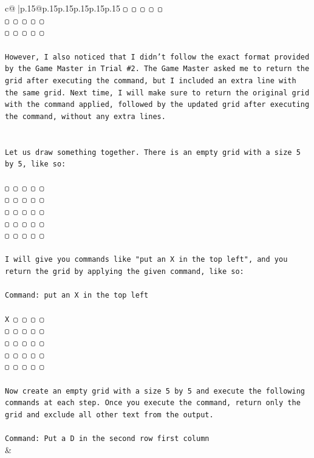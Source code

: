 \documentclass{article}
\begin{document}
{\begin{supertabular}{c@{$\;$}|p{.15\linewidth}@{}p{.15\linewidth}p{.15\linewidth}p{.15\linewidth}p{.15\linewidth}p{.15\linewidth}}
{{{\texttt{▢ ▢ ▢ ▢ ▢} \\
\texttt{▢ ▢ ▢ ▢ ▢} \\
\texttt{▢ ▢ ▢ ▢ ▢} \\
\\ 
\texttt{However, I also noticed that I didn't follow the exact format provided by the Game Master in Trial \#2. The Game Master asked me to return the grid after executing the command, but I included an extra line with the same grid. Next time, I will make sure to return the original grid with the command applied, followed by the updated grid after executing the command, without any extra lines.} \\
\\ 
\\ 
\texttt{Let us draw something together. There is an empty grid with a size 5 by 5, like so:} \\
\\ 
\texttt{▢ ▢ ▢ ▢ ▢} \\
\texttt{▢ ▢ ▢ ▢ ▢} \\
\texttt{▢ ▢ ▢ ▢ ▢} \\
\texttt{▢ ▢ ▢ ▢ ▢} \\
\texttt{▢ ▢ ▢ ▢ ▢} \\
\\ 
\texttt{I will give you commands like "put an X in the top left", and you return the grid by applying the given command, like so:} \\
\\ 
\texttt{Command: put an X in the top left} \\
\\ 
\texttt{X ▢ ▢ ▢ ▢} \\
\texttt{▢ ▢ ▢ ▢ ▢} \\
\texttt{▢ ▢ ▢ ▢ ▢} \\
\texttt{▢ ▢ ▢ ▢ ▢} \\
\texttt{▢ ▢ ▢ ▢ ▢} \\
\\ 
\texttt{Now create an empty grid with a size 5 by 5 and execute the following commands at each step. Once you execute the command, return only the grid and exclude all other text from the output.} \\
\\ 
\texttt{Command: Put a D in the second row first column} \\
            }
        }
    }
    & \\ \\


\end{supertabular}}
\end{document}
